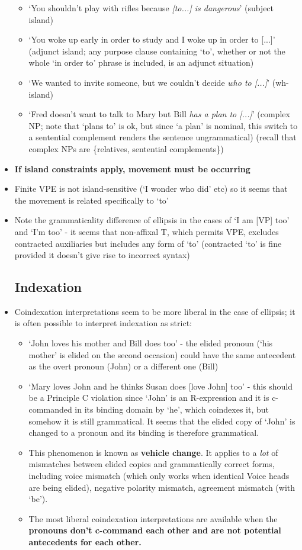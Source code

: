 \documentclass{article}
\begin{document}
\begin{itemize}
    \begin{itemize}
        \item `You shouldn't play with rifles because \textit{[to...] is dangerous}' (subject island)
        \item `You woke up early in order to study and I woke up in order to [...]' (adjunct island; any purpose clause containing `to', whether or not the whole `in order to' phrase is included, is an adjunct situation)
        \item `We wanted to invite someone, but we couldn't decide \textit{who to [...]}' (wh-island)
        \item `Fred doesn't want to talk to Mary but Bill \textit{has a plan to [...]}' (complex NP; note that `plans to' is ok, but since `a plan' is nominal, this switch to a sentential complement renders the sentence ungrammatical) (recall that complex NPs are \{relatives, sentential complements\})
    \end{itemize}
    \item \textbf{If island constraints apply, movement must be occurring}
    \item Finite VPE is not island-sensitive (`I wonder who did' etc) so it seems that the movement is related specifically to `to'
    \item Note the grammaticality difference of ellipsis in the cases of `I am [VP] too' and `I'm too' - it seems that non-affixal T, which permits VPE, excludes contracted auxiliaries but includes any form of `to' (contracted `to' is fine provided it doesn't give rise to incorrect syntax)
    \subsection{Indexation}
    \item Coindexation interpretations seem to be more liberal in the case of ellipsis; it is often possible to interpret indexation as strict:
    \begin{itemize}
        \item `John loves his mother and Bill does too' - the elided pronoun (`his mother' is elided on the second occasion) could have the same antecedent as the overt pronoun (John) or a different one (Bill)
        \item `Mary loves John and he thinks Susan does [love John] too' - this should be a Principle C violation since `John' is an R-expression and it is c-commanded in its binding domain by `he', which coindexes it, but somehow it is still grammatical. It seems that the elided copy of `John' is changed to a pronoun and its binding is therefore grammatical.
        \item This phenomenon is known as \textbf{vehicle change}. It applies to a \textit{lot} of mismatches between elided copies and grammatically correct forms, including voice mismatch (which only works when identical Voice heads are being elided), negative polarity mismatch, agreement mismatch (with `be').
        \item The most liberal coindexation interpretations are available when the \textbf{pronouns don't c-command each other and are not potential antecedents for each other.}
    \end{itemize}

\end{itemize}
\end{document}
